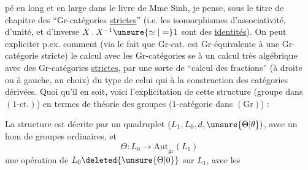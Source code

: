 %
pé en long et en large dans le livre de Mme Sinh, je pense, sous le titre de chapitre des ``Gr-catégories \uline{strictes}'' (i.e.  les isomorphismes d'associativité, d'unité, et d'inverse $X\mathbin{.}X^{-1}\unsure{\simeq|=}1$ sont des \uline{identités}). On peut expliciter p.ex. comment (via le fait que  Gr-cat. est Gr-équivalente à une Gr-catégorie stricte) le calcul avec les Gr-catégories se  à un calcul très algébrique avec des Gr-catégories \uline{strictes}, par une sorte de ``calcul des fractions'' (à droite ou à gauche, au choix) du type de celui qui  à la construction des catégories dérivées. Quoi qu'il en soit, voici l'explicitation de cette structure (groupe dans $(1\text{-ct.})$) en termes de théorie des groupes ($1$-catégorie dans $(\mathrm{Gr})$) :

La structure est décrite par un quadruplet $(L_1,L_0,d,\unsure{\Theta|\theta})$, avec
un hom de groupes ordinaires, et
\[
\Theta:L_0\longrightarrow\underline{\mathrm{Aut}}_{\mathrm{gr}}(L_1)
\]
une opération de $L_0\deleted{\unsure{\Theta|0}}$ sur $L_1$, avec les
